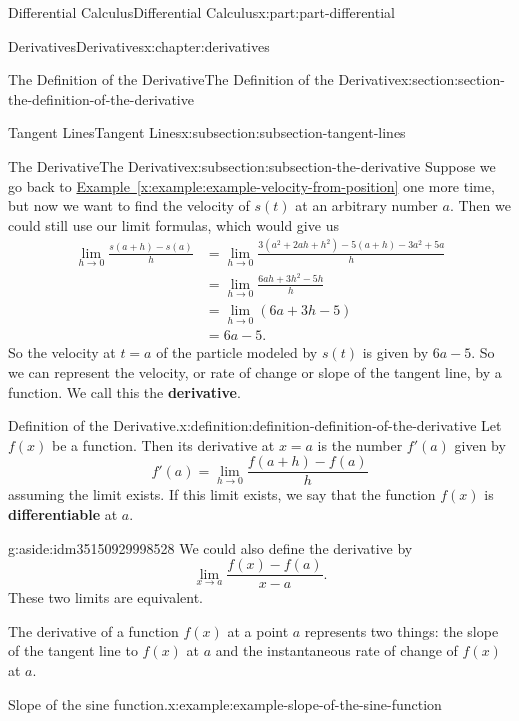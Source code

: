 \documentclass[twoside,10pt,]{book}
\newcommand{\xreffont}{\relax}
\newcommand{\terminology}[1]{\textbf{#1}}
\numberwithin{equation}{part}
\begin{document}
\begin{partptx}{Differential Calculus}{}{Differential Calculus}{}{}{x:part:part-differential}
\begin{chapterptx}{Derivatives}{}{Derivatives}{}{}{x:chapter:derivatives}
\begin{sectionptx}{The Definition of the Derivative}{}{The Definition of the Derivative}{}{}{x:section:section-the-definition-of-the-derivative}
\begin{subsectionptx}{Tangent Lines}{}{Tangent Lines}{}{}{x:subsection:subsection-tangent-lines}
\end{subsectionptx}
%
%
\typeout{************************************************}
\typeout{************************************************}
%
\begin{subsectionptx}{The Derivative}{}{The Derivative}{}{}{x:subsection:subsection-the-derivative}
Suppose we go back to \hyperref[x:example:example-velocity-from-position]{Example~{\xreffont\ref{x:example:example-velocity-from-position}}} one more time, but now we want to find the velocity of \(s(t)\) at an arbitrary number \(a\). Then we could still use our limit formulas, which would give us%
%
\begin{align*}
\lim_{h\to0}\frac{s(a+h)-s(a)}{h} & = \lim_{h\to0}\frac{3(a^{2}+2ah+h^{2})-5(a+h) - 3a^{2} + 5a}{h} \\
& = \lim_{h\to0}\frac{6ah+3h^{2} - 5h}{h} \\
& = \lim_{h\to0}(6a+3h-5) \\
& = 6a-5. 
\end{align*}
So the velocity at \(t=a\) of the particle modeled by \(s(t)\) is given by \(6a-5\). So we can represent the velocity, or rate of change or slope of the tangent line, by a function. We call this the \terminology{derivative}.%
\begin{definition}{Definition of the Derivative.}{x:definition:definition-definition-of-the-derivative}%
%
%
Let \(f(x)\) be a function. Then its derivative at \(x=a\) is the number \(f'(a)\) given by%
\begin{equation*}
f'(a) = \lim_{h\to0}\frac{f(a+h)-f(a)}{h}
\end{equation*}
assuming the limit exists. If this limit exists, we say that the function \(f(x)\) is \terminology{differentiable} at \(a\).%
\end{definition}
\begin{aside}{}{g:aside:idm35150929998528}%
We could also define the derivative by%
\begin{equation*}
\lim_{x\to a}\frac{f(x)-f(a)}{x-a}.
\end{equation*}
These two limits are equivalent.%
\end{aside}
The derivative of a function \(f(x)\) at a point \(a\) represents two things: the slope of the tangent line to \(f(x)\) at \(a\) and the instantaneous rate of change of \(f(x)\) at \(a\).%
\begin{example}{Slope of the sine function.}{x:example:example-slope-of-the-sine-function}%

\end{example}
\end{subsectionptx}
\end{sectionptx}
\end{chapterptx}
\end{partptx}
\end{document}
